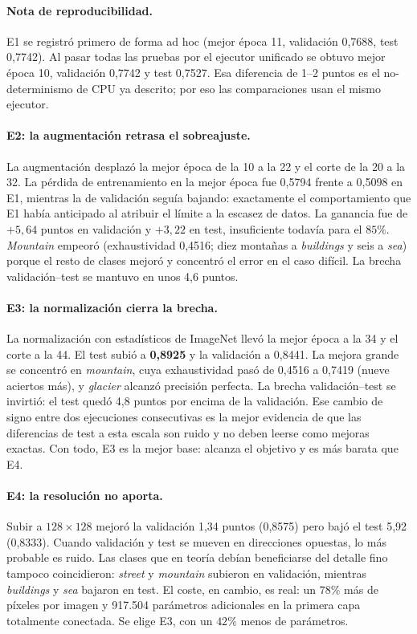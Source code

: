 \documentclass[11pt,a4paper]{article}
\begin{document}
\paragraph{Nota de reproducibilidad.}
E1 se registró primero de forma ad hoc (mejor época 11, validación 0,7688, test 0,7742). Al pasar todas las pruebas por el ejecutor unificado se obtuvo mejor época 10, validación 0,7742 y test 0,7527. Esa diferencia de 1--2 puntos es el no-determinismo de CPU ya descrito; por eso las comparaciones usan el mismo ejecutor.

\paragraph{E2: la augmentación retrasa el sobreajuste.}
La augmentación desplazó la mejor época de la 10 a la 22 y el corte de la 20 a la 32. La pérdida de entrenamiento en la mejor época fue 0,5794 frente a 0,5098 en E1, mientras la de validación seguía bajando: exactamente el comportamiento que E1 había anticipado al atribuir el límite a la escasez de datos. La ganancia fue de $+5,64$ puntos en validación y $+3,22$ en test, insuficiente todavía para el $85\%$. \emph{Mountain} empeoró (exhaustividad 0,4516; diez montañas a \emph{buildings} y seis a \emph{sea}) porque el resto de clases mejoró y concentró el error en el caso difícil. La brecha validación--test se mantuvo en unos 4,6 puntos.

\paragraph{E3: la normalización cierra la brecha.}
La normalización con estadísticos de ImageNet llevó la mejor época a la 34 y el corte a la 44. El test subió a \textbf{0,8925} y la validación a 0,8441. La mejora grande se concentró en \emph{mountain}, cuya exhaustividad pasó de 0,4516 a 0,7419 (nueve aciertos más), y \emph{glacier} alcanzó precisión perfecta. La brecha validación--test se invirtió: el test quedó 4,8 puntos por encima de la validación. Ese cambio de signo entre dos ejecuciones consecutivas es la mejor evidencia de que las diferencias de test a esta escala son ruido y no deben leerse como mejoras exactas. Con todo, E3 es la mejor base: alcanza el objetivo y es más barata que E4.

\paragraph{E4: la resolución no aporta.}
Subir a $128\times128$ mejoró la validación 1,34 puntos (0,8575) pero bajó el test 5,92 (0,8333). Cuando validación y test se mueven en direcciones opuestas, lo más probable es ruido. Las clases que en teoría debían beneficiarse del detalle fino tampoco coincidieron: \emph{street} y \emph{mountain} subieron en validación, mientras \emph{buildings} y \emph{sea} bajaron en test. El coste, en cambio, es real: un $78\%$ más de píxeles por imagen y 917.504 parámetros adicionales en la primera capa totalmente conectada. Se elige E3, con un $42\%$ menos de parámetros.
\end{document}
